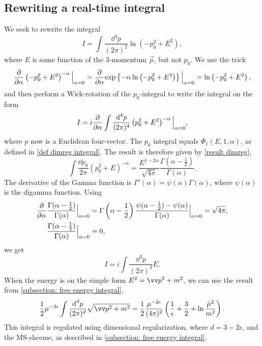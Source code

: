 \subsection{Rewriting a real-time integral}
\label{subsection: rewriting integral}


We seek to rewrite the integral
%
\begin{equation}
    \label{free energy logarithmic integral}
    I = \int \frac{\dd^4 p}{(2 \pi)^2} \ln(-p_0^2 + E^2),
\end{equation}
%
where $E$ is some function of the 3-momentum $\vec p$, but not $p_0$.
We use the trick
%
\begin{equation}
    \pdv{}{\alpha} \left(-p_0^2 + E^2\right)^{-\alpha} \Big|_{\alpha=0}
    = \pdv{}{\alpha} \text{exp} \left\{ -\alpha \ln\left(- p_0^2 + E^2\right) \right\} \Big|_{\alpha=0}
    = \ln\left(- p_0^2 + E^2\right),
\end{equation}
%
and then perform a Wick-rotation of the $p_0$-integral to write the integral on the form 
%
\begin{equation}
    I = i \pdv{}{\alpha} \int \frac{\text{d}^4 p}{(2 \pi)^4} \left(p_0^2 + E^2\right)^{-\alpha} \Big|_{\alpha=0},
\end{equation}
%
where $p$ now is a Euclidean four-vector.
The $p_0$ integral equals $\Phi_1(E, 1, \alpha)$, as defined in \autoref{def dimreg integral}. 
The result is therefore given by \autoref{result dimreg},
%
\begin{equation}
    \int \frac{\dd p_0}{2 \pi} (p_0^2 + E)^{-\alpha} 
    = \frac{E^{1-2\alpha}}{\sqrt{4 \pi}} \frac{\Gamma(\alpha-\frac{1}{2})}{\Gamma(\alpha)}.
\end{equation}
%
The derivative of the Gamma function is $\Gamma'(\alpha) = \psi(\alpha)\Gamma(\alpha)$, where $\psi(\alpha)$ is the digamma function.
Using
%
\begin{align}
    \pdv{}{\alpha} & \frac{\Gamma(\alpha - \frac{1}{2}) }{\Gamma(\alpha)} \Big|_{\alpha=0}
    = \Gamma\left(\alpha - \frac{1}{2}\right) \frac{\psi(\alpha - \frac{1}{2}) - \psi(\alpha)}{\Gamma(\alpha)} \Big|_{\alpha=0}
    = \sqrt{4 \pi}, \\
    & \frac{\Gamma(\alpha - \frac{1}{2}) }{\Gamma(\alpha)}\Big|_{\alpha=0} = 0,
\end{align}
%
we get
%
\begin{equation}
    I = i \int \frac{\dd^3 p}{(2 \pi)^3} E.
\end{equation}
%
When the energy is on the simple form $E^2 = \vv p^2 + m^2$, we can use the result from \autoref{subsection: free energy integral}, 
%
\begin{equation}
    \label{dimreg integral}
    \frac{1}{2} \mu^{-2\epsilon}  \int \frac{\dd^d p}{(2 \pi)^d} \sqrt{\vv p^2 + m^2}
    = \frac{1}{2} \frac{\mu^{-2\epsilon}}{(4 \pi)^2} 
    \left(\frac{1}{\epsilon} + \frac{3}{2} + \ln \frac{\tilde \mu^2}{m^2}\right).
\end{equation}
%
This integral is regulated using dimensional regularization, where $d = 3 - 2\epsilon $, and the $\overline{\text{MS}} $-shceme, as described in \autoref{subsection: free energy integral}.